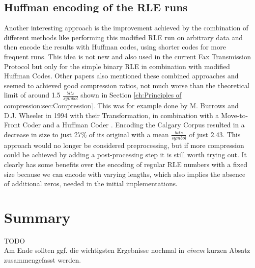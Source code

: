 \subsection{Huffman encoding of the RLE runs}
\par{
Another interesting approach is the improvement achieved by the combination of different methods like performing this modified RLE run on arbitrary data and then encode the results with Huffman codes, using shorter codes for more frequent runs. This idea is not new and also used in the current Fax Transmission Protocol but only for the simple binary RLE in combination with modified Huffman Codes. Other papers also mentioned these combined approaches and seemed to achieved good compression ratios, not much worse than the theoretical limit of around 1.5 $\frac{bits}{symbol}$ shown in Section \ref{ch:Principles of compression:sec:Compression}. This was for example done by M. Burrows and D.J. Wheeler in 1994 with their Transformation, in combination with a Move-to-Front Coder and a Huffman Coder \cite{Burrows94}. Encoding the Calgary Corpus resulted in a decrease in size to just 27\% of its original with a mean $\frac{bits}{symbol}$ of just $2.43$. This approach would no longer be considered preprocessing, but if more compression could be achieved by adding a post-processing step it is still worth trying out. It clearly has some benefits over the encoding of regular RLE numbers with a fixed size because we can encode with varying lengths, which also implies the absence of additional zeros, needed in the initial implementations.}

\section{Summary}
\label{ch:Analyse:sec:Summary}

TODO\\

Am Ende sollten ggf. die wichtigsten Ergebnisse nochmal in \emph{einem}
kurzen Absatz zusammengefasst werden.

